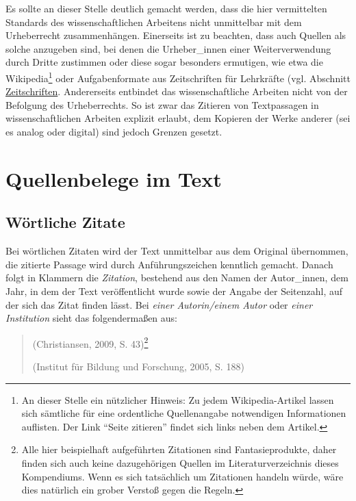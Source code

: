 \documentclass[ngerman,bibliography=totoc,oneside,12pt,a4paper]{scrbook}
\begin{document}
Es sollte an dieser Stelle deutlich gemacht werden, dass die hier
vermittelten Standards des wissenschaftlichen Arbeitens nicht
unmittelbar mit dem Urheberrecht zusammenhängen. Einerseits ist zu
beachten, dass auch Quellen als solche anzugeben sind, bei denen die
Urheber\_innen einer Weiterverwendung durch Dritte zustimmen oder diese
sogar besonders ermutigen, wie etwa die Wikipedia\footnote{An dieser
  Stelle ein nützlicher Hinweis: Zu jedem Wikipedia-Artikel lassen sich
  sämtliche für eine ordentliche Quellenangabe notwendigen Informationen
  auflisten. Der Link \enquote{Seite zitieren} findet sich links neben
  dem Artikel.} oder Aufgabenformate aus Zeitschriften für Lehrkräfte
(vgl. Abschnitt \protect\hyperlink{zeitschriften}{Zeitschriften}.
Andererseits entbindet das wissenschaftliche Arbeiten nicht von der
Befolgung des Urheberrechts. So ist zwar das Zitieren von Textpassagen
in wissenschaftlichen Arbeiten explizit erlaubt, dem Kopieren der Werke
anderer (sei es analog oder digital) sind jedoch Grenzen gesetzt.

\section{Quellenbelege im Text}\label{quellenbelege-im-text}

\subsection{Wörtliche Zitate}\label{wortliche-zitate}

Bei wörtlichen Zitaten wird der Text unmittelbar aus dem Original
übernommen, die zitierte Passage wird durch Anführungszeichen kenntlich
gemacht. Danach folgt in Klammern die \emph{Zitation}, bestehend aus den
Namen der Autor\_innen, dem Jahr, in dem der Text veröffentlicht wurde
sowie der Angabe der Seitenzahl, auf der sich das Zitat finden lässt.
Bei \emph{einer Autorin/einem Autor} oder \emph{einer Institution} sieht
das folgendermaßen aus:

\begin{quote}
(Christiansen, 2009, S. 43)\footnote{Alle hier beispielhaft aufgeführten
  Zitationen sind Fantasieprodukte, daher finden sich auch keine
  dazugehörigen Quellen im Literaturverzeichnis dieses Kompendiums. Wenn
  es sich tatsächlich um Zitationen handeln würde, wäre dies natürlich
  ein grober Verstoß gegen die Regeln.}

(Institut für Bildung und Forschung, 2005, S. 188)
\end{quote}
\end{document}
